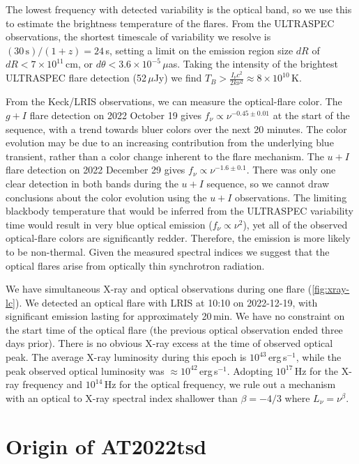 \documentclass{nature_plusfigure}
\newcommand{\at}{AT2022tsd}
\begin{document}
\begin{methods}
The lowest frequency with detected variability is the optical band, so we use this to estimate the brightness temperature of the flares.
From the ULTRASPEC observations, the shortest timescale of variability we resolve is $(30\,\mathrm{s})/(1+z) = 24\,$s, setting a limit on the emission region size $dR$ of $dR<7\times10^{11}\,$cm, or $d\theta < 3.6 \times 10^{-5}\,\mu$as. Taking the intensity of the brightest ULTRASPEC flare detection (52\,$\mu$Jy) we find $T_B > \frac{I_\nu c^2}{2 k\nu^2} \approx 8\times10^{10}\,$K.

From the Keck/LRIS observations, we can measure the optical-flare color. The $g+I$ flare detection on 2022 October 19 gives $f_\nu \propto \nu^{-0.45\pm0.01}$ at the start of the sequence, with a trend towards bluer colors over the next 20 minutes. The color evolution may be due to an increasing contribution from the underlying blue transient, rather than a color change inherent to the flare mechanism.
The $u+I$ flare detection on 2022 December 29 gives $f_\nu \propto \nu^{-1.6\pm0.1}$. There was only one clear detection in both bands during the $u+I$ sequence, so we cannot draw conclusions about the color evolution using the $u+I$ observations. 
The limiting blackbody temperature that would be inferred from the ULTRASPEC variability time would result in very blue optical emission ($f_\nu\propto\nu^2$), yet all of the observed optical-flare colors are significantly redder. Therefore, the emission is more likely to be non-thermal. Given the measured spectral indices we suggest that the optical flares arise from optically thin synchrotron radiation. 

We have simultaneous X-ray and optical observations during one flare (\ref{fig:xray-lc}). We detected an optical flare with LRIS at 10:10 on 2022-12-19, with significant emission lasting for approximately 20\,min. We have no constraint on the start time of the optical flare (the previous optical observation ended three days prior). There is no obvious X-ray excess at the time of observed optical peak. The average X-ray luminosity during this epoch is $10^{43}\,$erg\,s$^{-1}$, while the peak observed optical luminosity was $\approx 10^{42}$\,erg\,s$^{-1}$.
Adopting $10^{17}\,$Hz for the X-ray frequency and $10^{14}\,$Hz for the optical frequency, we rule out a mechanism with an optical to X-ray spectral index shallower than $\beta=-4/3$ where $L_\nu = \nu^{\beta}$. 

\section{Origin of \at}
\label{sec:at2022tsd-origin}


\end{methods}
\end{document}
